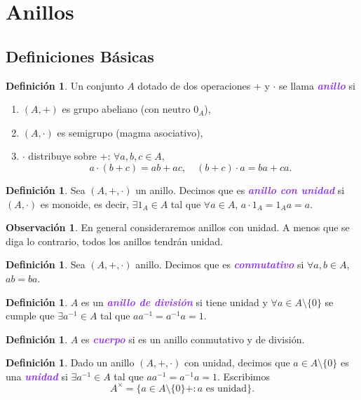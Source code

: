 \documentclass{article}
\theoremstyle{definition}
\newtheorem{definition}[theorem]{Definición}
\newtheorem*{obs}{Observación}
\theoremstyle{remark}
\numberwithin{equation}{section}
\renewcommand{\c}{\cdot}
\newcommand{\wea}[1]{\textcolor{BlueViolet}{\textbf{\emph{#1}}}}
\begin{document}
\newpage
\section{Anillos}
\subsection{Definiciones Básicas}

\begin{definition}
  Un conjunto $A$ dotado de dos operaciones $+$ y $\c$ se llama \wea{anillo} si
  \begin{enumerate}[(1)]
    \item $(A,+)$ es grupo abeliano (con neutro $0_A$),
    \item $(A,\c)$ es semigrupo (magma asociativo),
    \item $\c$ distribuye sobre $+$: $\forall a,b,c \in A$, 
    \[ a\c (b+c) = ab + ac, \quad (b+c) \c a = ba + ca. \]
  \end{enumerate}
\end{definition}

\begin{definition}
  Sea $(A,+,\c)$ un anillo. Decimos que es \wea{anillo con unidad} si $(A,\c)$ es monoide, es decir, $\exists 1_A \in A$ tal que $\forall a \in A$, $a \c 1_A = 1_A a = a$.
\end{definition}

\begin{obs}
  En general consideraremos anillos con unidad. A menos que se diga lo contrario, todos los anillos tendrán unidad.
\end{obs}

\begin{definition}
  Sea $(A,+,\c)$ anillo. Decimos que es \wea{conmutativo} si $\forall a,b \in A$, $ab = ba$.
\end{definition}

\begin{definition}
  $A$ es un \wea{anillo de división} si tiene unidad y $\forall a \in A \setminus \{0\}$ se cumple que $\exists a^{-1} \in A$ tal que $a a^{-1} = a^{-1} a = 1$.
\end{definition}

\begin{definition}
  $A$ es \wea{cuerpo} si es un anillo conmutativo y de división.
\end{definition}

\begin{definition}
  Dado un anillo $(A,+,\c)$ con unidad, decimos que $a \in A \setminus \{0\}$ es una \wea{unidad} si $\exists a^{-1} \in A$ tal que $aa^{-1} = a^{-1} a = 1$. Escribimos 
  \[ A^\times = \{a \in A \setminus \{0\}+ \colon a \text{ es unidad}\}. \]
\end{definition}
\end{document}
